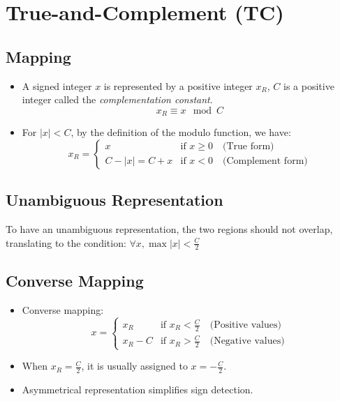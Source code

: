 \documentclass[12pt,openany]{book}
\begin{document}
	\section{True-and-Complement (TC)}
	
	\subsection{Mapping}
	\begin{itemize}
		\item[] A signed integer \( x \) is represented by a positive integer \( x_R \), \( C \) is a positive integer called the \textit{complementation constant}.
		      \[ x_R \equiv x \mod C \]
		          
		\item[] For \( |x| < C \), by the definition of the modulo function, we have:
		      \[
		      	x_R = 
		      	\begin{cases} 
		      		x               & \text{if } x \geq 0 \quad \text{(True form)}    \\
		      		C - |x| = C + x & \text{if } x < 0 \quad \text{(Complement form)} 
		      	\end{cases}
		      \]
	\end{itemize}
	
	\subsection{Unambiguous Representation}
	To have an unambiguous representation, the two regions should not overlap, translating to the condition:
		$\forall x, \max |x| < \frac{C}{2} $

	
	
	\subsection{Converse Mapping}
	\begin{itemize}
		\item[] Converse mapping:
		      \[
		      	x = 
		      	\begin{cases} 
		      		x_R     & \text{if } x_R < \frac{C}{2} \quad \text{(Positive values)} \\
		      		x_R - C & \text{if } x_R > \frac{C}{2} \quad \text{(Negative values)} 
		      	\end{cases}
		      \]
		\item[] When \( x_R = \frac{C}{2} \), it is usually assigned to \( x = -\frac{C}{2} \).
		\item[] Asymmetrical representation simplifies sign detection.
		      
	\end{itemize}
	
\end{document}
